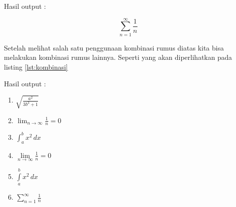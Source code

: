 Hasil output :

$$\sum^{\infty}_{n=1} \frac{1}{n}$$

Setelah melihat salah satu penggunaan kombinasi rumus diatas kita bisa melakukan kombinasi rumus lainnya. Seperti yang akan diperlihatkan pada listing \ref{lst:kombinasi}



Hasil output :
\begin{enumerate}
\item $\sqrt{ \frac{a^2}{3b^3+1}}$
\item $\lim_{n \to \infty} \frac{1}{n}=0$
\item $\int^b_a x^2 \, dx$
\item $\lim \limits_{n \to \infty} \frac{1}{n}=0$
\item $\int \limits^b_a x^2 \, dx$
\item $\sum \limits^{\infty}_{n=1} \frac{1}{n}$
\end{enumerate}





